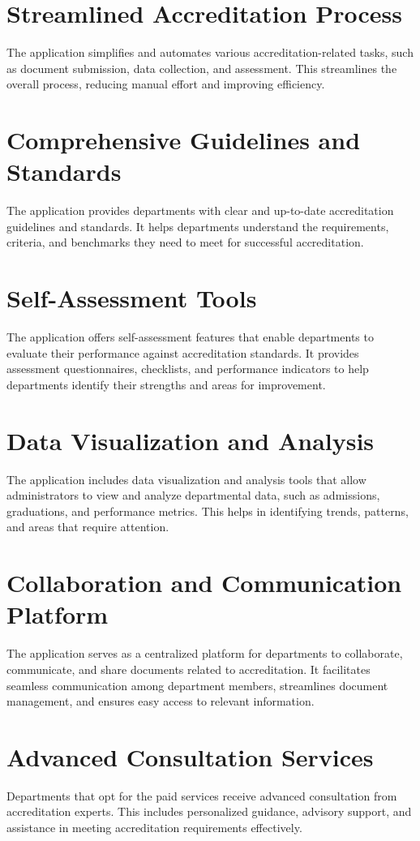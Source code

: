 \documentclass[a4paper,11pt]{report}
\begin{document}
\section{Streamlined Accreditation Process}
The application simplifies and automates various accreditation-related tasks, such as document submission, data collection, and assessment. This streamlines the overall process, reducing manual effort and improving efficiency.
\section{Comprehensive Guidelines and Standards}
The application provides departments with clear and up-to-date accreditation guidelines and standards. It helps departments understand the requirements, criteria, and benchmarks they need to meet for successful accreditation.
\section{Self-Assessment Tools}
The application offers self-assessment features that enable departments to evaluate their performance against accreditation standards. It provides assessment questionnaires, checklists, and performance indicators to help departments identify their strengths and areas for improvement.
\section{Data Visualization and Analysis}
The application includes data visualization and analysis tools that allow administrators to view and analyze departmental data, such as admissions, graduations, and performance metrics. This helps in identifying trends, patterns, and areas that require attention.
\section{Collaboration and Communication Platform}
The application serves as a centralized platform for departments to collaborate, communicate, and share documents related to accreditation. It facilitates seamless communication among department members, streamlines document management, and ensures easy access to relevant information.
\section{Advanced Consultation Services}
Departments that opt for the paid services receive advanced consultation from accreditation experts. This includes personalized guidance, advisory support, and assistance in meeting accreditation requirements effectively.
\end{document}
